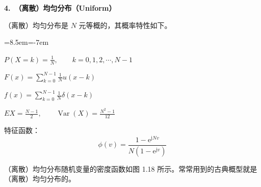 \documentclass[11pt,openany,UTF8]{ctexbook}
\newcommand{\eu}{\mathrm{e}}                       %
\newcommand{\ju}{\mathrm{j}}                       %
\DeclareMathOperator{\Var}{Var}                    %
\newcommand{\bhead}[1]{\par\medskip\noindent\textbf{#1}\par\smallskip}
\begin{document}
\bhead{4.\ （离散\nobreak）均匀分布（Uniform\nobreak）}

（离散\nobreak）均匀分布是 $N$ 元等概的\nobreak，其概率特性如下\nobreak。

\begin{list}{}{\leftmargin=8.5em\itemindent=-7em\itemsep=4pt\topsep=4pt\parsep=0pt}
  \item {}\quad $\displaystyle P(X=k)=\frac{1}{N},\qquad k=0,1,2,\cdots,N-1$
  \item {}\quad $\displaystyle F(x)=\sum_{k=0}^{N-1}\frac{1}{N}u(x-k)$
  \item {}\quad $\displaystyle f(x)=\sum_{k=0}^{N-1}\frac{1}{N}\delta(x-k)$
  \item {}\quad $EX=\frac{N-1}{2},\qquad \Var(X)=\frac{N^2-1}{12}$
\end{list}



特征函数\nobreak：
\[
\phi(v)=\frac{1-\eu^{\ju Nv}}{N(1-\eu^{\ju v})}
\]

（离散\nobreak）均匀分布随机变量的密度函数如图 1.18 所示\nobreak。常常用到的古典概型就是（离散\nobreak）均匀分布的\nobreak。
\end{document}
